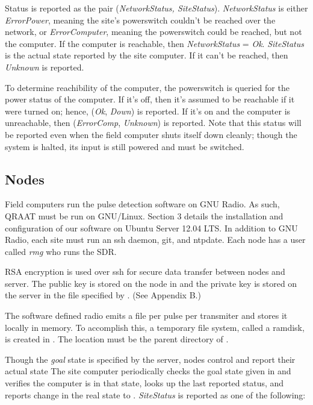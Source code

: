 \documentclass[letter]{article}
\begin{document}
Status is reported as the pair (\textit{NetworkStatus, SiteStatus}). \textit{NetworkStatus}
is either \textit{ErrorPower}, meaning the site's powerswitch couldn't be reached over the network, 
or \textit{ErrorComputer}, meaning the powerswitch could be reached, but not the computer. If the 
computer is reachable, then \textit{NetworkStatus} = \textit{Ok}. \textit{SiteStatus} is the actual 
state reported by the site computer. If it can't be reached, then \textit{Unknown} is reported. 

To determine reachibility of the computer, the powerswitch is queried for the power status of the 
computer. If it's off, then it's assumed to be reachable if it were turned on; hence, (\textit{Ok}, \textit{Down})
is reported. If it's on and the computer is unreachable, then (\textit{ErrorComp}, \textit{Unknown}) is reported. 
Note that this status will be reported even when the field computer shuts itself down cleanly; though the system
is halted, its input is still powered and must be switched. 

\subsection{Nodes}
Field computers run the pulse detection software on GNU Radio. As such, QRAAT must be
run on GNU/Linux. Section 3 details the installation and configuration of our
software on Ubuntu Server 12.04 LTS. In addition to GNU Radio, each site must run 
an ssh daemon, git, and ntpdate. Each node has a user called \textit{rmg} who runs the SDR. 

RSA encryption is used over ssh for secure data transfer between nodes and server. The 
public key is stored on the node in  and the private key
is stored on the server in the file specified by . (See Appendix B.)

The software defined radio emits a file per pulse per transmiter and stores it 
locally in memory. To accomplish this, a temporary file system, called a ramdisk, 
is created in . The location must be the parent directory 
of . 

Though the \textit{goal} state is specified by the server, nodes control and report their actual state 
The site computer periodically checks the goal state given in 
 and verifies the computer is in that state, looks up the last reported 
status, and reports change in the real state to . \textit{SiteStatus} is 
reported as one of the following: 
\end{document}
